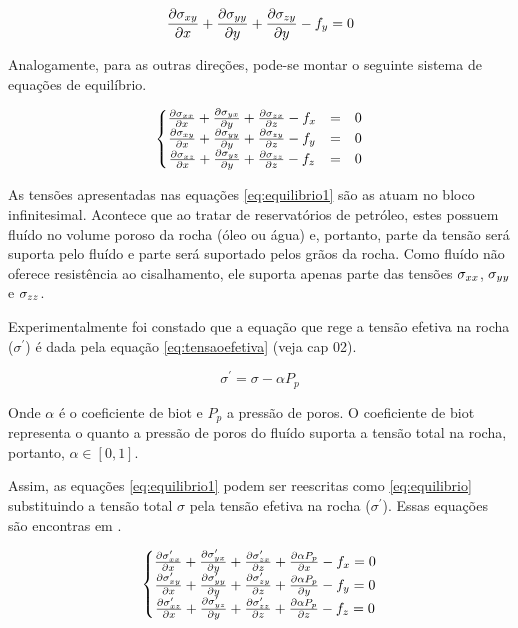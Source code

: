 \begin{equation}
\dx[\stxy] + \dy[\styy] + \dy[\stzy] - f_y = 0
\end{equation}

Analogamente, para as outras direções, pode-se montar o seguinte sistema de equações de equilíbrio.

\begin{equation}
\label{eq:equilibrio1}
\left\{\begin{matrix}
 \dx[\stxx] + \dy[\styx] + \dz[\stzx] - f_x & = & 0\\ 
 \dx[\stxy] + \dy[\styy] + \dz[\stzy] - f_y & = & 0\\ 
 \dx[\stxz] + \dy[\styz] + \dz[\stzz] - f_z & = & 0
\end{matrix}\right.
\end{equation}

As tensões apresentadas nas equações \ref{eq:equilibrio1} são as atuam no bloco infinitesimal. Acontece que ao tratar de reservatórios de petróleo, estes possuem fluído no volume poroso da rocha (óleo ou água) e, portanto, parte da tensão será suporta pelo fluído e parte será suportado pelos grãos da rocha. Como fluído não oferece resistência ao cisalhamento, ele suporta apenas parte das tensões $\stxx$, $\styy$ e $\stzz$.

Experimentalmente foi constado que a equação que rege a tensão efetiva na rocha ($\sigma^\prime$) é dada pela equação \ref{eq:tensaoefetiva} (veja \cite{ResGeomec} cap 02). 

\begin{equation}
\label{eq:tensaoefetiva}
    \sigma^\prime = \sigma - \alpha P_p
\end{equation}

Onde $\alpha$ é o coeficiente de biot e $P_p$ a pressão de poros. O coeficiente de biot representa o quanto a pressão de poros do fluído suporta a tensão total na rocha, portanto, $\alpha \in [0,1]$.

Assim, as equações \ref{eq:equilibrio1} podem ser reescritas como \ref{eq:equilibrio} substituindo a tensão total $\sigma$ pela tensão efetiva na rocha ($\sigma^\prime$). Essas equações são encontras em \cite{CompGeomec}.



\begin{equation}
\label{eq:equilibrio}
\left\{\begin{matrix}
\dx[\sxx]  + \dy[\syx] + \dz[\szx] + \dx[\alpha P_p] - f_x   = 0
\\
\dx[\sxy]  + \dy[\syy] + \dz[\szy] + \dy[\alpha P_p]  - f_y   = 0
\\
\dx[\sxz]  + \dy[\syz] + \dz[\szz] + \dz[\alpha P_p] - f_z   = 0
\end{matrix}\right.
\end{equation}


